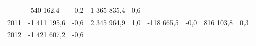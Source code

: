 \begin{longtable}[]{@{}lllllllll@{}}
\begin{minipage}[t]{0.06\columnwidth}
\end{minipage} & \begin{minipage}[t]{0.12\columnwidth}\raggedright
-540 162,4\strut
\end{minipage} & \begin{minipage}[t]{0.06\columnwidth}\raggedright
-0,2\strut
\end{minipage} & \begin{minipage}[t]{0.10\columnwidth}\raggedright
1 365 835,4\strut
\end{minipage} & \begin{minipage}[t]{0.06\columnwidth}\raggedright
0,6\strut
\end{minipage}\tabularnewline
\begin{minipage}[t]{0.05\columnwidth}\raggedright
2011\strut
\end{minipage} & \begin{minipage}[t]{0.10\columnwidth}\raggedright
-1 411 195,6\strut
\end{minipage} & \begin{minipage}[t]{0.06\columnwidth}\raggedright
-0,6\strut
\end{minipage} & \begin{minipage}[t]{0.16\columnwidth}\raggedright
2 345 964,9\strut
\end{minipage} & \begin{minipage}[t]{0.06\columnwidth}\raggedright
1,0\strut
\end{minipage} & \begin{minipage}[t]{0.12\columnwidth}\raggedright
-118 665,5\strut
\end{minipage} & \begin{minipage}[t]{0.06\columnwidth}\raggedright
-0,0\strut
\end{minipage} & \begin{minipage}[t]{0.10\columnwidth}\raggedright
816 103,8\strut
\end{minipage} & \begin{minipage}[t]{0.06\columnwidth}\raggedright
0,3\strut
\end{minipage}\tabularnewline
\begin{minipage}[t]{0.05\columnwidth}\raggedright
2012\strut
\end{minipage} & \begin{minipage}[t]{0.10\columnwidth}\raggedright
-1 421 607,2\strut
\end{minipage} & \begin{minipage}[t]{0.06\columnwidth}\raggedright
-0,6\strut
\end{minipage} & \begin{minipage}[t]{0.16\columnwidth}\raggedright

\end{minipage}
\end{longtable}
